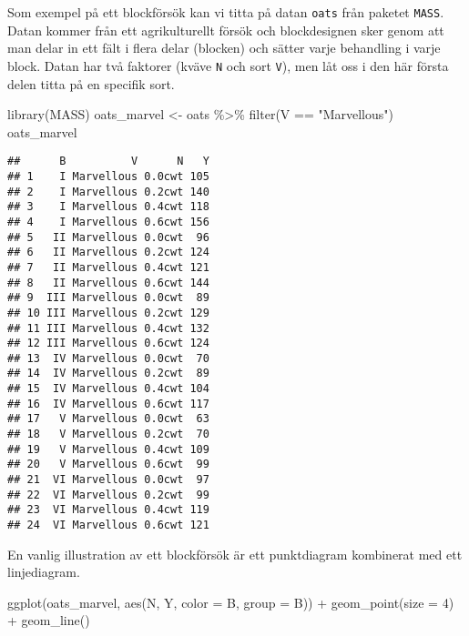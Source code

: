 \documentclass[
]{book}
\newenvironment{Shaded}{\begin{snugshade}}{\end{snugshade}}
\newcommand{\AttributeTok}[1]{\textcolor[rgb]{0.77,0.63,0.00}{#1}}
\newcommand{\DecValTok}[1]{\textcolor[rgb]{0.00,0.00,0.81}{#1}}
\newcommand{\FunctionTok}[1]{\textcolor[rgb]{0.00,0.00,0.00}{#1}}
\newcommand{\NormalTok}[1]{#1}
\newcommand{\OtherTok}[1]{\textcolor[rgb]{0.56,0.35,0.01}{#1}}
\newcommand{\SpecialCharTok}[1]{\textcolor[rgb]{0.00,0.00,0.00}{#1}}
\newcommand{\StringTok}[1]{\textcolor[rgb]{0.31,0.60,0.02}{#1}}
\theoremstyle{definition}
\theoremstyle{definition}
\theoremstyle{definition}
\theoremstyle{definition}
\theoremstyle{remark}
\begin{document}
Som exempel på ett blockförsök kan vi titta på datan \texttt{oats} från paketet \texttt{MASS}. Datan kommer från ett agrikulturellt försök och blockdesignen sker genom att man delar in ett fält i flera delar (blocken) och sätter varje behandling i varje block. Datan har två faktorer (kväve \texttt{N} och sort \texttt{V}), men låt oss i den här första delen titta på en specifik sort.

\begin{Shaded}
\begin{Highlighting}[]
\FunctionTok{library}\NormalTok{(MASS)}
\NormalTok{oats\_marvel }\OtherTok{\textless{}{-}}\NormalTok{ oats }\SpecialCharTok{\%\textgreater{}\%} \FunctionTok{filter}\NormalTok{(V }\SpecialCharTok{==} \StringTok{"Marvellous"}\NormalTok{)}
\NormalTok{oats\_marvel}
\end{Highlighting}
\end{Shaded}

\begin{verbatim}
##      B          V      N   Y
## 1    I Marvellous 0.0cwt 105
## 2    I Marvellous 0.2cwt 140
## 3    I Marvellous 0.4cwt 118
## 4    I Marvellous 0.6cwt 156
## 5   II Marvellous 0.0cwt  96
## 6   II Marvellous 0.2cwt 124
## 7   II Marvellous 0.4cwt 121
## 8   II Marvellous 0.6cwt 144
## 9  III Marvellous 0.0cwt  89
## 10 III Marvellous 0.2cwt 129
## 11 III Marvellous 0.4cwt 132
## 12 III Marvellous 0.6cwt 124
## 13  IV Marvellous 0.0cwt  70
## 14  IV Marvellous 0.2cwt  89
## 15  IV Marvellous 0.4cwt 104
## 16  IV Marvellous 0.6cwt 117
## 17   V Marvellous 0.0cwt  63
## 18   V Marvellous 0.2cwt  70
## 19   V Marvellous 0.4cwt 109
## 20   V Marvellous 0.6cwt  99
## 21  VI Marvellous 0.0cwt  97
## 22  VI Marvellous 0.2cwt  99
## 23  VI Marvellous 0.4cwt 119
## 24  VI Marvellous 0.6cwt 121
\end{verbatim}

En vanlig illustration av ett blockförsök är ett punktdiagram kombinerat med ett linjediagram.

\begin{Shaded}
\begin{Highlighting}[]
\FunctionTok{ggplot}\NormalTok{(oats\_marvel, }\FunctionTok{aes}\NormalTok{(N, Y, }\AttributeTok{color =}\NormalTok{ B, }\AttributeTok{group =}\NormalTok{ B)) }\SpecialCharTok{+}
  \FunctionTok{geom\_point}\NormalTok{(}\AttributeTok{size =} \DecValTok{4}\NormalTok{) }\SpecialCharTok{+}
  \FunctionTok{geom\_line}\NormalTok{()}
\end{Highlighting}
\end{Shaded}
\end{document}
